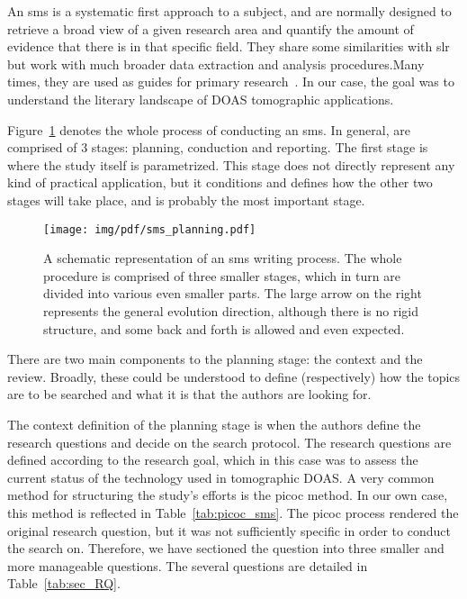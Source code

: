An \gls{sms} is a systematic first approach to a subject, and are
normally designed to retrieve a broad view of a given research area and
quantify the amount of evidence that there is in that specific field.
They share some similarities with \gls{slr} but work with much broader
data extraction and analysis procedures.Many times, they are used as
guides for primary research~\cite{Kitchenham2007}. In our case, the goal
was to understand the literary landscape of \gls{DOAS} tomographic
applications.

Figure~\ref{fig:sms_planning} denotes the whole process of conducting
an \gls{sms}. In general,  are comprised of 3 stages:
planning, conduction and reporting. The first stage is where the study
itself is parametrized. This stage does not directly represent any kind
of practical application, but it conditions and defines how the other
two stages will take place, and is probably the most important stage.

\begin{figure}[htpb]
    \centering
    \texttt{[image: img/pdf/sms\_planning.pdf]}
    \caption{A schematic representation of an \gls{sms} writing process.
    The whole procedure is comprised of three smaller stages, which in
    turn are divided into various even smaller parts. The large arrow on the
    right represents the general evolution direction, although there is no
    rigid structure, and some back and forth is allowed and even expected.}
    \label{fig:sms_planning}
\end{figure}

There are two main components to the planning stage: the context and the
review. Broadly, these could be understood to define (respectively) how
the topics are to be searched and what it is that the authors are
looking for.

The context definition of the planning stage is when the authors define
the research questions and decide on the search protocol. The research
questions are defined according to the research goal, which in this case
was to assess the current status of the technology used in tomographic
\gls{DOAS}. A very common method for structuring the study's efforts is
the \gls{picoc} method. In our own case, this method is reflected in
Table~\ref{tab:picoc_sms}. The \gls{picoc} process rendered the original
research question, but it was not sufficiently specific in order to
conduct the search on. Therefore, we have sectioned the question into
three smaller and more manageable questions. The several questions are
detailed in Table~\ref{tab:sec_RQ}.

